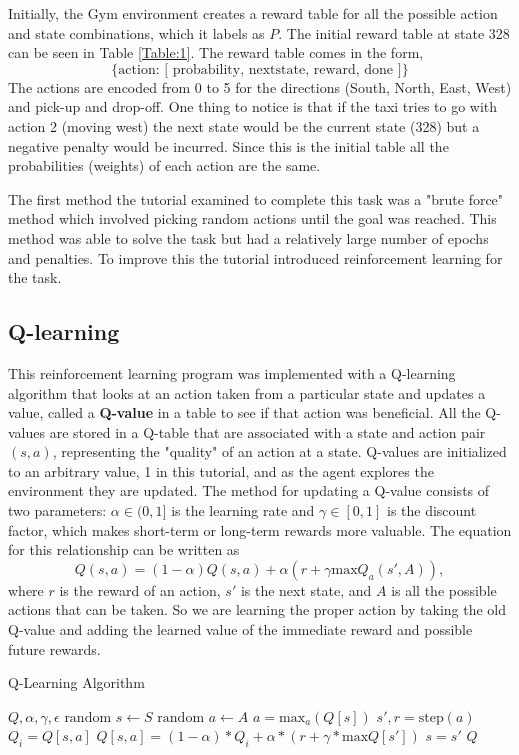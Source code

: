 \documentclass[10pt,twocolumn]{article}
\begin{document}
Initially, the Gym environment creates a reward table for all the possible action and state combinations, which it labels as $P$.
The initial reward table at state 328 can be seen in Table \ref{Table:1}.
The reward table comes in the form, \[ \{\text{action: [ probability, nextstate, reward, done ]} \} \]
The actions are encoded from 0 to 5 for the directions (South, North, East, West) and pick-up and drop-off.
One thing to notice is that if the taxi tries to go with action 2 (moving west) the next state would be the current state (328) but a negative penalty would be incurred.
Since this is the initial table all the probabilities (weights) of each action are the same.

The first method the tutorial examined to complete this task was a "brute force" method which involved picking random actions until the goal was reached.
This method was able to solve the task but had a relatively large number of epochs and penalties.
To improve this the tutorial introduced reinforcement learning for the task.

\subsection{Q-learning}
This reinforcement learning program was implemented with a Q-learning algorithm that looks at an action taken from a particular state and updates a value, called a \textbf{Q-value} in a table to see if that action was beneficial.
All the Q-values are stored in a Q-table that are associated with a state and action pair $(s, a)$, representing the "quality" of an action at a state.
Q-values are initialized to an arbitrary value, 1 in this tutorial, and as the agent explores the environment they are updated.
The method for updating a Q-value consists of two parameters: $\alpha \in (0, 1]$ is the learning rate and $\gamma \in [0, 1]$ is the discount factor, which makes short-term or long-term rewards more valuable.
The equation for this relationship can be written as \[ Q(s, a) = (1 - \alpha)Q(s, a) + \alpha(r + \gamma \text{max}Q_a(s', A)),\] where $r$ is the reward of an action, $s'$ is the next state, and $A$ is all the possible actions that can be taken.
So we are learning the proper action by taking the old Q-value and adding the learned value of the immediate reward and possible future rewards.

\begin{algorithm}
\label{Algorithm: 1}
\caption{Q-Learning Algorithm}
\begin{algorithmic}
\REQUIRE $Q, \alpha, \gamma, \epsilon$
\STATE $\text{random } s \leftarrow S$
\STATE $\text{random } a \leftarrow A$
\ELSE
\STATE $a = \text{max}_a(Q[s])$
\ENDIF
\STATE $s', r = \text{step}(a)$
\STATE $Q_i = Q[s, a]$
\STATE $Q[s, a] = (1 - \alpha) * Q_i + \alpha * (r + \gamma *  \text{max}Q[s'])$
\STATE $s = s'$
\ENDWHILE
\RETURN $Q$
\ENDFOR
\end{algorithmic}
\end{algorithm}
\end{document}
